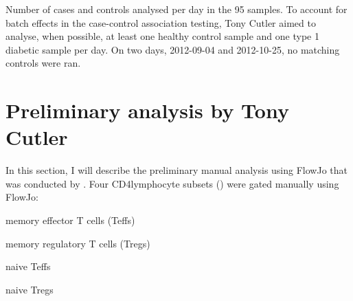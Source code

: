 { Number of cases and controls analysed per day in the 95 samples. }
{
  To account for batch effects in the case-control association testing,
  Tony Cutler aimed to analyse, when possible,
  at least one healthy control sample and one type 1 diabetic sample per day.
  On two days, 2012-09-04 and 2012-10-25, no matching controls were ran.
}

\clearpage

\section{Preliminary analysis by Tony Cutler}

In this section, I will describe the preliminary manual analysis using FlowJo that was conducted by .
Four CD4\positive lymphocyte subsets () were gated manually using FlowJo:
\begin{itemise}
    \item memory effector T cells (Teffs)
    \item memory regulatory T cells (Tregs)
    \item naive Teffs
    \item naive Tregs
\end{itemise}

